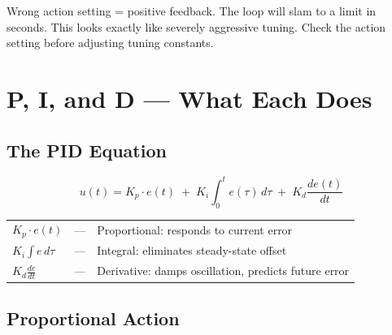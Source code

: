 \documentclass[12pt,twoside,openright]{memoir}
\begin{document}
\begin{warningbox}
Wrong action setting = positive feedback. The loop will slam to a limit in seconds. This looks exactly like severely aggressive tuning. Check the action setting before adjusting tuning constants.
\end{warningbox}

\chapter{P, I, and D --- What Each Does}

\section{The PID Equation}

\begin{tcolorbox}[
  enhanced, breakable,
  colback=pidnavy!98, colframe=pidblue, arc=6pt,
  title={\sffamily\bfseries\color{white} The PID Control Law},
  fonttitle=\bfseries\sffamily,
  attach boxed title to top left={yshift=-2mm, xshift=6mm},
  boxed title style={colback=pidblue, arc=3pt}
]
\vspace{4pt}
\begin{equation}
\boxed{u(t) = K_p \cdot e(t) \;+\; K_i \int_0^t e(\tau)\,d\tau \;+\; K_d \frac{de(t)}{dt}}
\end{equation}
\vspace{2pt}
\begin{center}
\begin{tabular}{@{}lll@{}}
$K_p \cdot e(t)$ & --- & \textcolor{pidcyan}{Proportional}: responds to current error \\
$K_i \int e\,d\tau$ & --- & \textcolor{pidyellow}{Integral}: eliminates steady-state offset \\
$K_d \frac{de}{dt}$ & --- & \textcolor{pidorange}{Derivative}: damps oscillation, predicts future error \\
\end{tabular}
\end{center}
\vspace{2pt}
\end{tcolorbox}

\section{Proportional Action}
\end{document}
